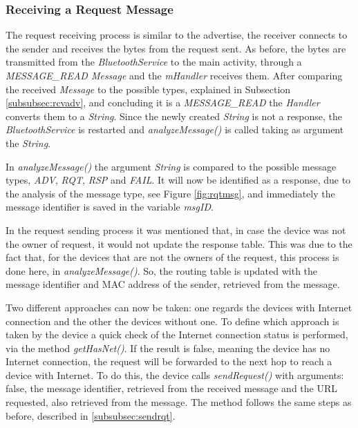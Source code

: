 \subsubsection{Receiving a Request Message}
\label{subsubsec:rcvrqt}

The request receiving process is similar to the advertise, the receiver connects to the sender and receives the bytes from the request sent. As before, the bytes are transmitted from the \textit{BluetoothService} to the main activity, through a \textit{MESSAGE\_READ Message} and the \textit{mHandler} receives them. After comparing the received \textit{Message} to the possible types, explained in Subsection \ref{subsubsec:rcvadv}, and concluding it is a \textit{MESSAGE\_READ} the \textit{Handler} converts them to a \textit{String}. Since the newly created \textit{String} is not a response, the \textit{BluetoothService} is restarted and \textit{analyzeMessage()} is called taking as argument the \textit{String}.

In \textit{analyzeMessage()} the argument \textit{String} is compared to the possible message types, \textit{ADV}, \textit{RQT}, \textit{RSP} and \textit{FAIL}. It will now be identified as a response, due to the analysis of the message type, see Figure \ref{fig:rqtmsg}, and immediately the message identifier is saved in the variable \textit{msgID}.

In the request sending process it was mentioned that, in case the device was not the owner of request, it would not update the response table. This was due to the fact that, for the devices that are not the owners of the request, this process is done here, in \textit{analyzeMessage()}. So, the routing table is updated with the message identifier and \gls{MAC} address of the sender, retrieved from the message.

Two different approaches can now be taken: one regards the devices with Internet connection and the other the devices without one. To define which approach is taken by the device a quick check of the Internet connection status is performed, via the method \textit{getHasNet()}. If the result is false, meaning the device has no Internet connection, the request will be forwarded to the next hop to reach a device with Internet. To do this, the device calls \textit{sendRequest()} with arguments: false, the message identifier, retrieved from the received message and the \gls{URL} requested, also retrieved from the message. The method follows the same steps as before, described in \ref{subsubsec:sendrqt}.

